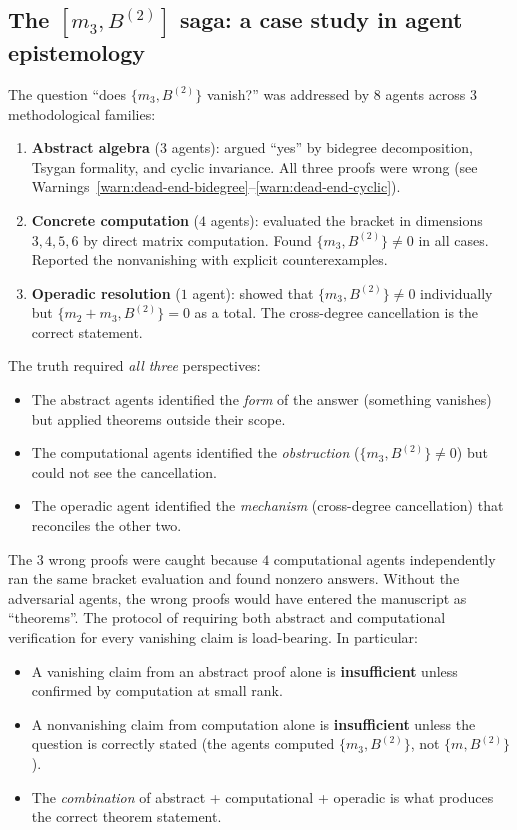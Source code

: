 \documentclass[11pt]{article}
\begin{document}
\subsection{The $[m_3, B^{(2)}]$ saga: a case study in agent epistemology}
\label{subsec:m3-B2-saga}

The question ``does $\{m_3, B^{(2)}\}$ vanish?'' was addressed by
$8$ agents across $3$ methodological families:

\begin{enumerate}[label=\textup{(\roman*)}]
 \item \textbf{Abstract algebra} ($3$ agents): argued ``yes'' by
 bidegree decomposition, Tsygan formality, and cyclic invariance.
 All three proofs were wrong (see Warnings~\ref{warn:dead-end-bidegree}--\ref{warn:dead-end-cyclic}).
 \item \textbf{Concrete computation} ($4$ agents): evaluated the
 bracket in dimensions $3, 4, 5, 6$ by direct matrix computation.
 Found $\{m_3, B^{(2)}\} \neq 0$ in all cases. Reported the
 nonvanishing with explicit counterexamples.
 \item \textbf{Operadic resolution} ($1$ agent): showed that
 $\{m_3, B^{(2)}\} \neq 0$ individually but
 $\{m_2 + m_3, B^{(2)}\} = 0$ as a total. The cross-degree
 cancellation is the correct statement.
\end{enumerate}

\noindent The truth required \emph{all three} perspectives:
\begin{itemize}
 \item The abstract agents identified the \emph{form} of the answer
 (something vanishes) but applied theorems outside their scope.
 \item The computational agents identified the \emph{obstruction}
 ($\{m_3, B^{(2)}\} \neq 0$) but could not see the cancellation.
 \item The operadic agent identified the \emph{mechanism}
 (cross-degree cancellation) that reconciles the other two.
\end{itemize}

\begin{remark}
\label{rem:adversarial-essential}
The $3$ wrong proofs were caught because $4$ computational agents
independently ran the same bracket evaluation and found nonzero
answers. Without the adversarial agents, the wrong proofs would have
entered the manuscript as ``theorems''. The protocol of requiring
both abstract and computational verification for every vanishing
claim is load-bearing. In particular:
\begin{itemize}
 \item A vanishing claim from an abstract proof alone is
 \textbf{insufficient} unless confirmed by computation at small rank.
 \item A nonvanishing claim from computation alone is
 \textbf{insufficient} unless the question is correctly stated
 (the agents computed $\{m_3, B^{(2)}\}$, not $\{m, B^{(2)}\}$).
 \item The \emph{combination} of abstract + computational + operadic
 is what produces the correct theorem statement.
\end{itemize}
\end{remark}
\end{document}
